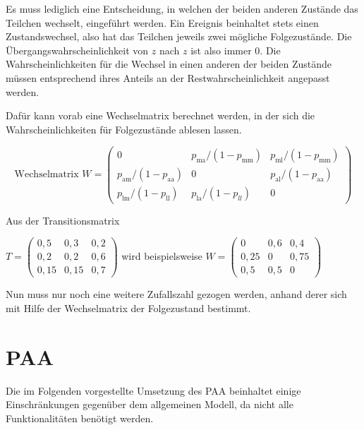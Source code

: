 Es muss lediglich eine Entscheidung, in welchen der beiden anderen Zustände das Teilchen wechselt, eingeführt werden. Ein Ereignis beinhaltet stets einen Zustandswechsel, also hat das Teilchen jeweils zwei mögliche Folgezustände. Die Übergangswahrscheinlichkeit von $z$ nach $z$ ist also immer $0$. Die Wahrscheinlichkeiten für die Wechsel in einen anderen der beiden Zustände müssen entsprechend ihres Anteils an der Restwahrscheinlichkeit angepasst werden.

Dafür kann vorab eine Wechselmatrix berechnet werden, in der sich die Wahrscheinlichkeiten für Folgezustände ablesen lassen.

\begin{equation}
\text{Wechselmatrix } W = 
\begin{pmatrix}
0 &  p_{\text{ma}}/(1-p_{\text{mm}}) & p_{\text{ml}}/(1-p_{\text{mm}}) \\
p_{\text{am}}/(1- p_{\text{aa}}) & 0 & p_{\text{al}}/(1- p_{\text{aa}}) \\
p_{\text{lm}}/(1-p_{\text{ll}}) &  p_{\text{la}}/(1-p_{ll}) & 0 
\end{pmatrix}  
\label{Wechselmatrix}
\end{equation}

Aus der Transitionsmatrix

$T= 
\begin{pmatrix}
0,5 & 0,3 & 0,2 \\
0,2 & 0,2 & 0,6 \\
0,15 & 0,15 & 0,7 
\end{pmatrix}
$  
wird beispielsweise  
$W= 
\begin{pmatrix}
0 & 0,6 & 0,4 \\
0,25 & 0 & 0,75 \\
0,5 & 0,5 & 0 
\end{pmatrix}
$  

Nun muss nur noch eine weitere Zufallszahl gezogen werden, anhand derer sich mit Hilfe der Wechselmatrix der Folgezustand bestimmt.


\section{PAA}

Die im Folgenden vorgestellte Umsetzung des PAA beinhaltet einige Einschränkungen gegenüber dem allgemeinen Modell, da nicht alle Funktionalitäten benötigt werden.

